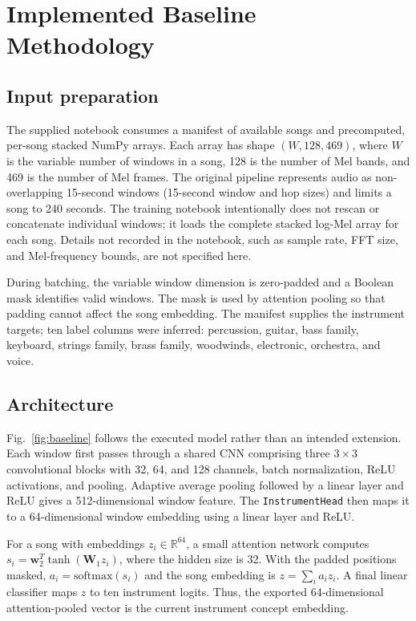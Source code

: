 \documentclass[conference]{IEEEtran}
\begin{document}
\section{Implemented Baseline Methodology}
\subsection{Input preparation}
The supplied notebook consumes a manifest of available songs and precomputed, per-song stacked NumPy arrays. Each array has shape $(W,128,469)$, where $W$ is the variable number of windows in a song, 128 is the number of Mel bands, and 469 is the number of Mel frames. The original pipeline represents audio as non-overlapping 15-second windows (15-second window and hop sizes) and limits a song to 240 seconds. The training notebook intentionally does not rescan or concatenate individual windows; it loads the complete stacked log-Mel array for each song. Details not recorded in the notebook, such as sample rate, FFT size, and Mel-frequency bounds, are not specified here.

During batching, the variable window dimension is zero-padded and a Boolean mask identifies valid windows. The mask is used by attention pooling so that padding cannot affect the song embedding. The manifest supplies the instrument targets; ten label columns were inferred: percussion, guitar, bass family, keyboard, strings family, brass family, woodwinds, electronic, orchestra, and voice.

\subsection{Architecture}
Fig.~\ref{fig:baseline} follows the executed model rather than an intended extension. Each window first passes through a shared CNN comprising three $3\times3$ convolutional blocks with 32, 64, and 128 channels, batch normalization, ReLU activations, and pooling. Adaptive average pooling followed by a linear layer and ReLU gives a 512-dimensional window feature. The \texttt{InstrumentHead} then maps it to a 64-dimensional window embedding using a linear layer and ReLU.

For a song with embeddings $z_i\in\mathbb{R}^{64}$, a small attention network computes $s_i=\mathbf{w}_2^T\tanh(\mathbf{W}_1z_i)$, where the hidden size is 32. With the padded positions masked, $a_i=\mathrm{softmax}(s_i)$ and the song embedding is $z=\sum_i a_i z_i$. A final linear classifier maps $z$ to ten instrument logits. Thus, the exported 64-dimensional attention-pooled vector is the current instrument concept embedding.
\end{document}
